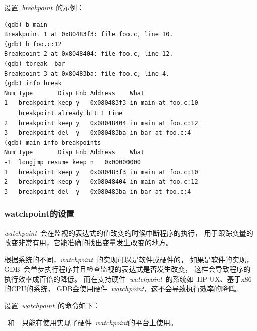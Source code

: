 设置~\emph{breakpoint}~的示例：
\begin{lstlisting}
(gdb) b main
Breakpoint 1 at 0x80483f3: file foo.c, line 10.
(gdb) b foo.c:12
Breakpoint 2 at 0x8048404: file foo.c, line 12.
(gdb) tbreak  bar
Breakpoint 3 at 0x80483ba: file foo.c, line 4.
(gdb) info break
Num Type       Disp Enb Address    What
1   breakpoint keep y   0x080483f3 in main at foo.c:10
    breakpoint already hit 1 time
2   breakpoint keep y   0x08048404 in main at foo.c:12
3   breakpoint del  y   0x080483ba in bar at foo.c:4
(gdb) main info breakpoints
Num Type       Disp Enb Address    What
-1  longjmp resume keep n   0x00000000
1   breakpoint keep y   0x080483f3 in main at foo.c:10
2   breakpoint keep y   0x08048404 in main at foo.c:12
3   breakpoint del  y   0x080483ba in bar at foo.c:4
\end{lstlisting}

\subsubsection{watchpoint的设置}
\label{sec:gdb_watchpoint} 
\emph{watchpoint}~会在监视的表达式的值改变的时候中断程序的执行，
用于跟踪变量的改变非常有用，它能准确的找出变量发生改变的地方。

根据系统的不同，\emph{watchpoint}~的实现可以是软件或硬件的，
如果是软件的实现，GDB~会单步执行程序并且检查监视的表达式是否发生改变，
这样会导致程序的执行效率成百倍的降低。
而在支持硬件~\emph{watchpoint}~的系统如~HP-UX、基于x86的CPU的系统，
GDB会使用硬件~\emph{watchpoint}，这不会导致执行效率的降低。

设置~\emph{watchpoint}~的命令如下：

\noindent
{} 



\noindent
{} 


\noindent
{} 


~和~~只能在使用实现了硬件~\emph{watchpoint}的平台上使用。

